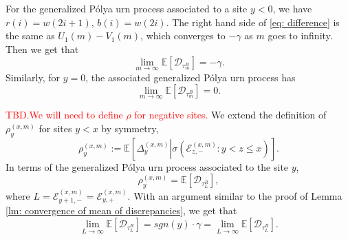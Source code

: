 \documentclass[twoside,12pt,a4paper]{article}
\numberwithin{equation}{section}
\newcommand\TBD{\textcolor{red}{TBD.}}
\newcommand{\edt}[1]{\textcolor{red}{#1}} %
\begin{document}
		For the generalized P\'{o}lya urn process associated to a site $y<0$, we have $r(i) = w(2i+1)$, $b(i) =w(2i)$. The right hand side of \eqref{eq: difference} is the same as $U_1(m)-V_1(m)$, which converges to $-\gamma$ as $m$ goes to infinity. Then we get that  $$\lim_{m\to\infty}\mathbb{E}\left[ \mathcal{D}_{\tau^B_m} \right] = -\gamma.$$
		Similarly, for $y=0$, the associated generalized P\'{o}lya urn process has 
		$$\lim_{m\to\infty}\mathbb{E}\left[ \mathcal{D}_{\tau^B_m} \right] = 0.$$
		
		\TBD \edt{We will need to define $\rho$ for negative sites.} We extend the definition of $\rho^{(x,m)}_y$ for sites $y< x$ by symmetry, 
		\[
	\rho^{(x,m)}_y := \mathbb{E}\left[  \Delta^{(x,m)}_y   \left\vert  \sigma\left( \mathcal{E}^{(x,m)}_{z, -}:  y<z\leq  x  \right. \right) \right].   \]
	In terms of the generalized P\'{o}lya urn process associated to the site $y$,
		\begin{equation} \label{eq: extended definition}
			\rho^{(x,m)}_y = \mathbb{E}\left[\mathcal{D}_{\tau_L^R}\right], 
		\end{equation} where $L = \mathcal{E}^{(x,m)}_{y+1,-} = \mathcal{E}^{(x,m)}_{y,+}.$ With an argument similar to the proof of Lemma \ref{lm: convergence of mean of discrepancies}, we get that 
		\begin{equation}\label{eq: mean of discrepancies for left sites}
			\lim_{L\to \infty} \mathbb{E}\left[\mathcal{D}_{\tau_L^R}\right] =  sgn(y) \cdot \gamma = \lim_{L\to \infty} \mathbb{E}\left[\mathcal{D}_{\tau_L^B}\right].
		\end{equation}
		
\end{document}
